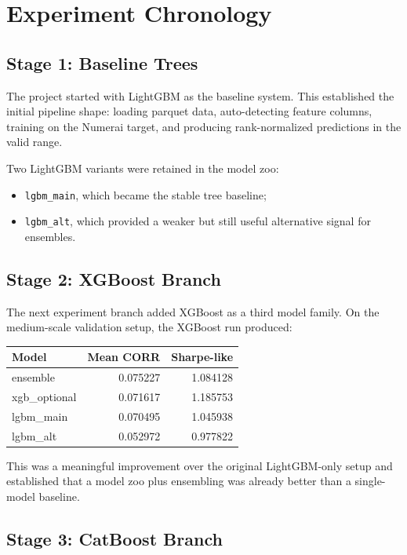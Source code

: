 \documentclass[11pt]{article}
\begin{document}
\section{Experiment Chronology}

\subsection{Stage 1: Baseline Trees}

The project started with LightGBM as the baseline system. This established the initial pipeline shape: loading parquet data, auto-detecting feature columns, training on the Numerai target, and producing rank-normalized predictions in the valid range.

Two LightGBM variants were retained in the model zoo:

\begin{itemize}[leftmargin=1.5em]
  \item \texttt{lgbm\_main}, which became the stable tree baseline;
  \item \texttt{lgbm\_alt}, which provided a weaker but still useful alternative signal for ensembles.
\end{itemize}

\subsection{Stage 2: XGBoost Branch}

The next experiment branch added XGBoost as a third model family. On the medium-scale validation setup, the XGBoost run produced:

\begin{center}
\begin{tabular}{lrr}
\toprule
Model & Mean CORR & Sharpe-like \\
\midrule
ensemble & 0.075227 & 1.084128 \\
xgb\_optional & 0.071617 & 1.185753 \\
lgbm\_main & 0.070495 & 1.045938 \\
lgbm\_alt & 0.052972 & 0.977822 \\
\bottomrule
\end{tabular}
\end{center}

This was a meaningful improvement over the original LightGBM-only setup and established that a model zoo plus ensembling was already better than a single-model baseline.

\subsection{Stage 3: CatBoost Branch}
\end{document}
